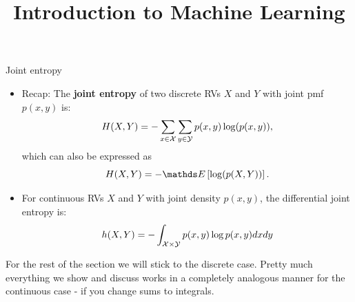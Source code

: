 \documentclass[11pt,compress,t,notes=noshow, xcolor=table]{beamer}
\title{Introduction to Machine Learning}
\begin{document}
    

\begin{vbframe}{Joint entropy}
\begin{itemize}
  \item Recap: The \textbf{joint entropy} of two discrete RVs $X$ and $Y$ with joint pmf $p(x, y)$ is:
  $$ H(X,Y) = -\sum_{x \in \mathcal{X}} \sum_{y \in \mathcal{Y}}  p(x,y) \log(p(x,y)),$$ 
  which can also be expressed as $$ H(X,Y) = -\E \left[ \log(p(X,Y)) \right].$$
  \item For continuous RVs $X$ and $Y$ with joint density $p(x,y)$, the differential joint entropy is:\\
  $$ h(X,Y) = - \int_{\mathcal{X} \times \mathcal{Y}} p(x,y) \log p(x,y) dx dy$$
\end{itemize}

\begin{footnotesize}
For the rest of the section we will stick to the discrete case. Pretty much everything we show and discuss works in a completely analogous manner for the continuous case - if you change sums to integrals.
\end{footnotesize}

\end{vbframe}
\end{document}
